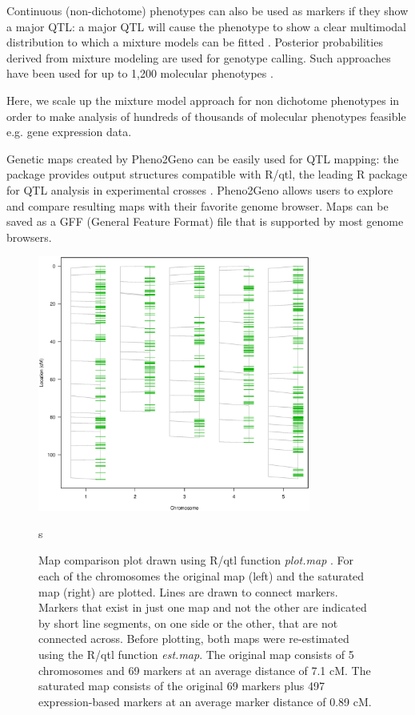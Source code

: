 Continuous (non-dichotome) phenotypes can also be used as markers if they show a major QTL: a 
major QTL will cause the phenotype to show a clear multimodal distribution to which a mixture 
models can be fitted \cite{Jansen:1993, Jansen:2001a}. Posterior probabilities derived from 
mixture modeling are used for genotype calling. Such approaches have been used for up to 
1,200 molecular phenotypes \cite{Gort:2010}.

Here, we scale up the mixture model approach for non dichotome phenotypes in order to make 
analysis of hundreds of thousands of molecular phenotypes feasible e.g. gene expression data.

Genetic maps created by Pheno2Geno can be easily used for QTL mapping: the package provides 
output structures compatible with R/qtl, the leading R package for QTL analysis in 
experimental crosses \cite{Broman:2003, Arends:2010}. Pheno2Geno allows users to 
explore and compare resulting maps with their favorite genome browser. Maps can be saved
as a GFF (General Feature Format) file that is supported by most genome browsers.

\begin{figure}[h!]
  \centering
  \includegraphics[keepaspectratio,width=0.8\textwidth]{eps/image_2_1.eps}
  \caption[Map comparison]{Map comparison plot drawn using R/qtl function \emph{plot.map} \cite{Broman:2003, Arends:2010}. For 
          each of the chromosomes the original map (left) and the saturated map (right) are plotted. Lines are drawn
          to connect markers.  Markers that exist in just one map and not the other are indicated by short line 
          segments, on one side or the other, that are not connected across. Before plotting, both maps were 
          re-estimated using the R/qtl function \emph{est.map}. The original map consists of 5 chromosomes and 69 
          markers at an average distance of 7.1 cM. The saturated map consists of the original 69 markers plus 497 
          expression-based markers at an average marker distance of 0.89 cM.}
          s\label{fig:mapcomparison}
\end{figure}

